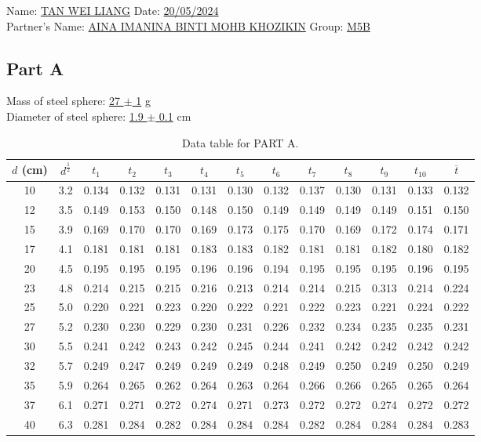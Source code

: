 \documentclass[a4paper,11pt]{article}
\begin{document}
\bigskip
\noindent Name: \underline{TAN WEI LIANG\hfill} \hfill Date: \underline{20/05/2024} \\
\noindent Partner's Name: \underline{AINA IMANINA BINTI MOHB KHOZIKIN\hfill} \hfill Group: \underline{M5B}

\subsection*{Part A}
Mass of steel sphere: \underline{27 $\pm$ 1} g\\
Diameter of steel sphere: \underline{1.9 $\pm$ 0.1} cm\\
\begin{table}[h!]
\caption*{Data table for PART A.}
\label{table:part_a}
\begin{tabular}{|c|c|*{10}{c|}c|}
\hline
$d$ (cm) & $d^{\frac{1}{2}}$ & $t_1$ & $t_2$ & $t_3$ & $t_4$ & $t_5$ & $t_6$ & $t_7$ & $t_8$ & $t_9$ & $t_{10}$ & $\overline{t}$ \\
\hline
10 & 3.2 & 0.134 & 0.132 & 0.131 & 0.131 & 0.130 & 0.132 & 0.137 & 0.130 & 0.131 & 0.133 & 0.132 \\
12 & 3.5 & 0.149 & 0.153 & 0.150 & 0.148 & 0.150 & 0.149 & 0.149 & 0.149 & 0.149 & 0.151 & 0.150 \\
15 & 3.9 & 0.169 & 0.170 & 0.170 & 0.169 & 0.173 & 0.175 & 0.170 & 0.169 & 0.172 & 0.174 & 0.171 \\
17 & 4.1 & 0.181 & 0.181 & 0.181 & 0.183 & 0.183 & 0.182 & 0.181 & 0.181 & 0.182 & 0.180 & 0.182 \\
20 & 4.5 & 0.195 & 0.195 & 0.195 & 0.196 & 0.196 & 0.194 & 0.195 & 0.195 & 0.195 & 0.196 & 0.195 \\
23 & 4.8 & 0.214 & 0.215 & 0.215 & 0.216 & 0.213 & 0.214 & 0.214 & 0.215 & 0.313 & 0.214 & 0.224 \\
25 & 5.0 & 0.220 & 0.221 & 0.223 & 0.220 & 0.222 & 0.221 & 0.222 & 0.223 & 0.221 & 0.224 & 0.222 \\
27 & 5.2 & 0.230 & 0.230 & 0.229 & 0.230 & 0.231 & 0.226 & 0.232 & 0.234 & 0.235 & 0.235 & 0.231 \\
30 & 5.5 & 0.241 & 0.242 & 0.243 & 0.242 & 0.245 & 0.244 & 0.241 & 0.242 & 0.242 & 0.242 & 0.242 \\
32 & 5.7 & 0.249 & 0.247 & 0.249 & 0.249 & 0.249 & 0.248 & 0.249 & 0.250 & 0.249 & 0.250 & 0.249 \\
35 & 5.9 & 0.264 & 0.265 & 0.262 & 0.264 & 0.263 & 0.264 & 0.266 & 0.266 & 0.265 & 0.265 & 0.264 \\
37 & 6.1 & 0.271 & 0.271 & 0.272 & 0.274 & 0.271 & 0.273 & 0.272 & 0.272 & 0.274 & 0.272 & 0.272 \\
40 & 6.3 & 0.281 & 0.284 & 0.282 & 0.284 & 0.284 & 0.284 & 0.282 & 0.284 & 0.284 & 0.284 & 0.283 \\
\hline
\end{tabular}
\end{table}
\end{document}
